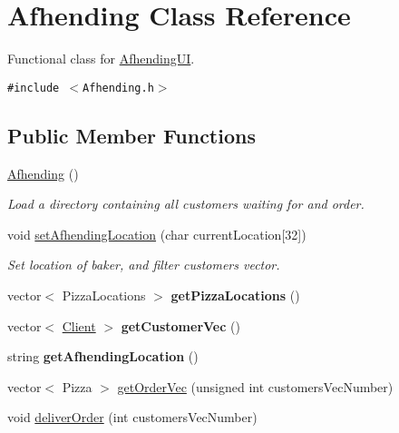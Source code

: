 \hypertarget{class_afhending}{
\section{Afhending Class Reference}
\label{class_afhending}
}
Functional class for \hyperlink{class_afhending_u_i}{Afhending\-UI}.  


{\tt \#include $<$Afhending.h$>$}

\subsection*{Public Member Functions}
\begin{CompactItemize}
\item 
\hypertarget{class_afhending_9365433a6f973ad929ffc0b458bc7c6f}{
\hyperlink{class_afhending_9365433a6f973ad929ffc0b458bc7c6f}{Afhending} ()}
\label{class_afhending_9365433a6f973ad929ffc0b458bc7c6f}

\begin{CompactList}\small\item\em Load a directory containing all customers waiting for and order. \item\end{CompactList}\item 
void \hyperlink{class_afhending_411cc45b50d4a59a33d76f6c54e52f78}{set\-Afhending\-Location} (char current\-Location\mbox{[}32\mbox{]})
\begin{CompactList}\small\item\em Set location of baker, and filter customers vector. \item\end{CompactList}\item 
\hypertarget{class_afhending_3d38e7498fba59674c7d3838bf4c1824}{
vector$<$ Pizza\-Locations $>$ {\bf get\-Pizza\-Locations} ()}
\label{class_afhending_3d38e7498fba59674c7d3838bf4c1824}

\item 
\hypertarget{class_afhending_3970b0afe27b514282442b11592e1602}{
vector$<$ \hyperlink{class_client}{Client} $>$ {\bf get\-Customer\-Vec} ()}
\label{class_afhending_3970b0afe27b514282442b11592e1602}

\item 
\hypertarget{class_afhending_543bc751e47e95a5382a13e161387a1b}{
string {\bf get\-Afhending\-Location} ()}
\label{class_afhending_543bc751e47e95a5382a13e161387a1b}

\item 
vector$<$ Pizza $>$ \hyperlink{class_afhending_ad0cbeddec394b25c5eade57247f4110}{get\-Order\-Vec} (unsigned int customers\-Vec\-Number)
\item 
void \hyperlink{class_afhending_b3cb078e2502d2eb7e6e67623cbe30b9}{deliver\-Order} (int customers\-Vec\-Number)
\end{CompactItemize}
